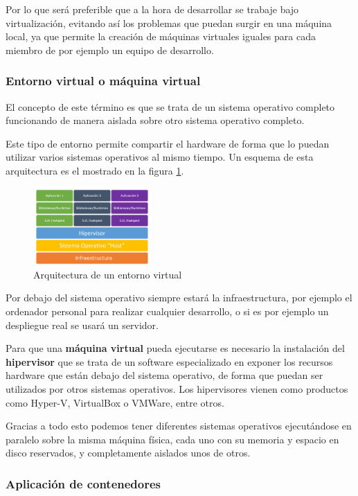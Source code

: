 Por lo que será preferible que a la hora de desarrollar se trabaje bajo virtualización, evitando así los problemas que puedan surgir en una máquina local, ya que permite la creación de máquinas virtuales iguales para cada miembro de por ejemplo un equipo de desarrollo.
\subsubsection{Entorno virtual o máquina virtual}
El concepto de este término es que se trata de un sistema operativo completo funcionando de manera aislada sobre otro sistema operativo completo.

Este tipo de entorno permite compartir el hardware de forma que lo puedan utilizar varios sistemas operativos al mismo tiempo.
\newpage
Un esquema de esta arquitectura es el mostrado en la figura \ref{virtual}.
\begin{figure}[H]
	\centering
	\includegraphics[width=0.4\textwidth]{imagenes/entorno/virtual.png}
	\caption{Arquitectura de un entorno virtual} \label{virtual}
\end{figure}
Por debajo del sistema operativo siempre estará la infraestructura, por ejemplo el ordenador personal para realizar cualquier desarrollo, o si es por ejemplo un despliegue real se usará un servidor.

Para que una \textbf{máquina virtual} pueda ejecutarse es necesario la instalación del \textbf{hipervisor} que se trata de un software especializado en exponer los recursos hardware que están debajo del sistema operativo, de forma que puedan ser utilizados por otros sistemas operativos. Los hipervisores vienen como productos como Hyper-V, VirtualBox o VMWare, entre otros.

Gracias a todo esto podemos tener diferentes sistemas operativos ejecutándose en paralelo sobre la misma máquina física, cada uno con su memoria y espacio en disco reservados, y completamente aislados unos de otros.
\subsubsection{Aplicación de contenedores}


